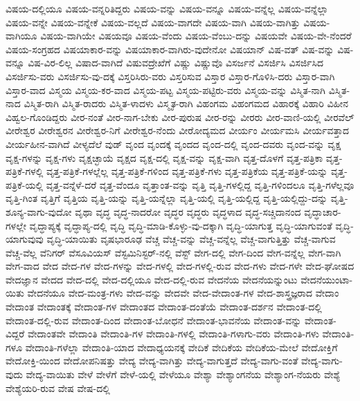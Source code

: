 {ವಿಷಯ-ದಲ್ಲಿಯೂ
ವಿಷಯ-ವನ್ನರಿತಿದ್ದರು
ವಿಷಯ-ವನ್ನು
ವಿಷಯ-ವನ್ನೂ
ವಿಷಯ-ವನ್ನೆಲ್ಲ
ವಿಷಯ-ವನ್ನೆಲ್ಲಾ
ವಿಷಯ-ವನ್ನೇ
ವಿಷಯ-ವನ್ನೇಕೆ
ವಿಷಯ-ವಲ್ಲದೆ
ವಿಷಯ-ವಾಗದೇ
ವಿಷಯ-ವಾಗಿ
ವಿಷಯ-ವಾಗಿತ್ತು
ವಿಷಯ-ವಾಗಿಯೂ
ವಿಷಯ-ವಾಗಿಯೇ
ವಿಷಯವೂ
ವಿಷಯ-ವೆಂದು
ವಿಷಯ-ವೆಂಬು-ದನ್ನು
ವಿಷಯವೇ
ವಿಷಯ-ವೇ-ನೆಂದರೆ
ವಿಷಯ-ಸಂಗ್ರಹದ
ವಿಷಯಾಕಾರ-ವನ್ನು
ವಿಷಯಾಕಾರ-ವಾಗಿರು-ವುದೇನೋ
ವಿಷಯಾನ್
ವಿಷ-ವತ್
ವಿಷ-ವನ್ನು
ವಿಷ-ವನ್ನೂ
ವಿಷ-ವಿರ-ಲಿಲ್ಲ
ವಿಷಾದ-ವಾಗಿದೆ
ವಿಷುವದ್ರೇಖೆಗೆ
ವಿಷ್ಣು
ವಿಷ್ಣುವೊ
ವಿಸರ್ಜನೆ
ವಿಸರ್ಜಿಸಿ
ವಿಸರ್ಜಿಸಿದ
ವಿಸರ್ಜಿಸು-ವರು
ವಿಸರ್ಜಿಸು-ವು-ದಕ್ಕೆ
ವಿಸ್ತರಿಸಿರು-ವರು
ವಿಸ್ತರಿಸುವ
ವಿಸ್ತಾರ
ವಿಸ್ತಾರ-ಗೊಳಿಸಿ-ದರು
ವಿಸ್ತಾರ-ವಾಗಿ
ವಿಸ್ತಾರ-ವಾದ
ವಿಸ್ಮಯ
ವಿಸ್ಮಯ-ಕರ-ವಾದ
ವಿಸ್ಮಯ-ಪಟ್ಟ
ವಿಸ್ಮಯ-ಪಟ್ಟಿರು-ವರು
ವಿಸ್ಮಯ-ವನ್ನು
ವಿಸ್ಮಿತ-ನಾಗಿ
ವಿಸ್ಮಿತ-ನಾದ
ವಿಸ್ಮಿತ-ರಾಗಿ
ವಿಸ್ಮಿತ-ರಾದರು
ವಿಸ್ಮಿತ-ಳಾದಳು
ವಿಸ್ಮೃತ-ರಾಗಿ
ವಿಹಂಗಮ
ವಿಹಂಗಮದ
ವಿಹಾರಕ್ಕೆ
ವಿಹಾರಿ
ವಿಹೀನ
ವಿಹ್ವಲ-ಗೊಂಡಿದ್ದರು
ವೀರ-ನಂತೆ
ವೀರ-ನಾಗ-ಬೇಕು
ವೀರ-ಪುರುಷ
ವೀರ-ರನ್ನು
ವೀರರು
ವೀರ-ವಾಣಿ-ಯಲ್ಲಿ
ವೀರವೆಲ್
ವೀರೇಶ್ವರ
ವೀರೇಶ್ವರನ
ವೀರೇಶ್ವರ-ನಿಗೆ
ವೀರೇಶ್ವರ-ನೆಂದು
ವೀರೋದ್ಯಮದ
ವೀರ್ಯಂ
ವೀರ್ಯಮಸಿ
ವೀರ್ಯವತ್ತಾದ
ವೀರ್ಯಹೀನ-ವಾಗಿದೆ
ವೀಳ್ಯದೆಲೆ
ವುಡ್
ವೃಂದ
ವೃಂದಕ್ಕೆ
ವೃಂದದ
ವೃಂದ-ದಲ್ಲಿ
ವೃಂದ-ದವರು
ವೃಂದ-ವನ್ನು
ವೃಕ್ಷ
ವೃಕ್ಷ-ಗಳನ್ನು
ವೃಕ್ಷ-ಗಳು
ವೃಕ್ಷಚ್ಛಾಯೆ
ವೃಕ್ಷದ
ವೃಕ್ಷ-ದಲ್ಲಿ
ವೃಕ್ಷ-ವನ್ನು
ವೃಕ್ಷ-ವಾಗಿ
ವೃತ್ತ-ದೊಳಗೆ
ವೃತ್ತ-ಪತ್ರಿಕಾ
ವೃತ್ತ-ಪತ್ರಿಕೆ-ಗಳಲ್ಲಿ
ವೃತ್ತ-ಪತ್ರಿಕೆ-ಗಳಲ್ಲೆಲ್ಲ
ವೃತ್ತ-ಪತ್ರಿಕೆ-ಗಳಿಂದ
ವೃತ್ತ-ಪತ್ರಿಕೆ-ಗಳು
ವೃತ್ತ-ಪತ್ರಿಕೆಯ
ವೃತ್ತ-ಪತ್ರಿಕೆ-ಯನ್ನು
ವೃತ್ತ-ಪತ್ರಿಕೆ-ಯಲ್ಲಿ
ವೃತ್ತ-ವನ್ನೆಳೆ-ದರೆ
ವೃತ್ತ-ವೆಂದೂ
ವೃತ್ತಾಂತ-ವನ್ನು
ವೃತ್ತಿ
ವೃತ್ತಿ-ಗಳಲ್ಲಿದ್ದ
ವೃತ್ತಿ-ಗಳಿಂದಲೂ
ವೃತ್ತಿ-ಗಳೆಲ್ಲವೂ
ವೃತ್ತಿ-ಗಿಂತ
ವೃತ್ತಿಗೆ
ವೃತ್ತಿಯ
ವೃತ್ತಿ-ಯನ್ನು
ವೃತ್ತಿ-ಯನ್ನೆಲ್ಲಾ
ವೃತ್ತಿ-ಯಲ್ಲಿ
ವೃತ್ತಿ-ಯಲ್ಲಿದ್ದ
ವೃತ್ತಿ-ಯಲ್ಲಿದ್ದು-ದನ್ನು
ವೃತ್ತಿ-ಶೂನ್ಯ-ವಾಗು-ವುದೋ
ವೃಥಾ
ವೃದ್ಧ
ವೃದ್ಧ-ನಾದರೋ
ವೃದ್ಧರ
ವೃದ್ಧರು
ವೃದ್ಧಳಾದ
ವೃದ್ಧ-ಸಚ್ಚಿದಾನಂದ
ವೃದ್ಧಾಚಾರ-ಗಳಲ್ಲೇ
ವೃದ್ಧಾಪ್ಯಕ್ಕೆ
ವೃದ್ಧಾಪ್ಯ-ದಲ್ಲಿ
ವೃದ್ಧಿ
ವೃದ್ಧಿ-ಮಾಡಿ-ಕೊಳ್ಳು-ವು-ದಕ್ಕಾಗಿ
ವೃದ್ಧಿ-ಯಾಗುತ್ತ
ವೃದ್ಧಿ-ಯಾಗುವಂತೆ
ವೃದ್ಧಿ-ಯಾಗುವುವು
ವೃದ್ಧಿ-ಯಾಯಿತು
ವೃಷಭಾರೂಢ
ವೆಚ್ಚ
ವೆಚ್ಚ-ವನ್ನು
ವೆಚ್ಚ-ವನ್ನೆಲ್ಲ
ವೆಚ್ಚ-ವಾಗುತ್ತಿತ್ತು
ವೆಚ್ಚ-ವಾಗುವ
ವೆಚ್ಚ-ವೆಲ್ಲ
ವೆನಿಗರ್
ವೆಸೂವಿಯಸ್
ವೆಸ್ಟಮಿನಿಸ್ಟರ್-ನಲ್ಲಿ
ವೆಸ್ಟ್
ವೇಗ-ದಲ್ಲಿ
ವೇಗ-ದಿಂದ
ವೇಗ-ವನ್ನೆಲ್ಲ
ವೇಗ-ವಾಗಿ
ವೇಗ-ವಾದ
ವೇದ
ವೇದ-ಗಳ
ವೇದ-ಗಳನ್ನು
ವೇದ-ಗಳಲ್ಲಿ
ವೇದ-ಗಳಲ್ಲಿ-ರುವ
ವೇದ-ಗಳು
ವೇದ-ಗಳೇ
ವೇದ-ಘೋಷದ
ವೇದಜ್ಞಾನ
ವೇದದ
ವೇದ-ದಲ್ಲಿ
ವೇದ-ದಲ್ಲಿಯೂ
ವೇದ-ದಲ್ಲಿ-ರುವ
ವೇದನೆಯ
ವೇದನೆಯನ್ನುಂಟು
ವೇದನೆಯುಂಟಾ-ಯಿತು
ವೇದನೆಯೂ
ವೇದ-ಮಂತ್ರ-ಗಳು
ವೇದ-ವನ್ನು
ವೇದವೇ
ವೇದ-ವೇದಾಂತ-ಗಳ
ವೇದ-ಶಾಸ್ತ್ರಜ್ಞರಾದ
ವೇದಾಂ
ವೇದಾಂತ
ವೇದಾಂತಕ್ಕೆ
ವೇದಾಂತ-ಗಳ
ವೇದಾಂತದ
ವೇದಾಂತ-ದಂತೆಯೆ
ವೇದಾಂತ-ದರ್ಶನ
ವೇದಾಂತ-ದಲ್ಲಿ
ವೇದಾಂತ-ದಲ್ಲಿ-ರುವ
ವೇದಾಂತ-ದಿಂದ
ವೇದಾಂತ-ಬೋಧನೆ
ವೇದಾಂತ-ಭಾವನೆಯ
ವೇದಾಂತ-ವನ್ನು
ವೇದಾಂತ-ವಿದ್ದರೆ
ವೇದಾಂತವೇ
ವೇದಾಂತಿ
ವೇದಾಂತಿ-ಗಳ
ವೇದಾಂತಿ-ಗಳಲ್ಲಿ
ವೇದಾಂತಿ-ಗಳಾಗು-ವರು
ವೇದಾಂತಿ-ಗಳು
ವೇದಾಂತಿ-ಗಳೂ
ವೇದಾಂತಿ-ಗಳೆಲ್ಲಾ
ವೇದಾಂತಿ-ಯಾದ
ವೇದಾಧ್ಯಯನಕ್ಕೆ
ವೇದಿಕೆ
ವೇದಿಕೆಯ
ವೇದಿಕೆಯ-ಮೇಲೆ
ವೇದೋಕ್ತಿಗೆ
ವೇದೋಕ್ತಿ-ಯಿಂದ
ವೇದೋಪನಿಷತ್ತು
ವೇದ್ಯ
ವೇದ್ಯ-ವಾಗಿತ್ತು
ವೇದ್ಯ-ವಾಗುತ್ತದೆ
ವೇದ್ಯ-ವಾಗು-ವಂತೆ
ವೇದ್ಯ-ವಾಗು-ವುದು
ವೇದ್ಯ-ವಾಯಿತು
ವೇಳೆ
ವೇಳೆಗೆ
ವೇಳೆ-ಯಲ್ಲಿ
ವೇಳೆಯೂ
ವೇಶ್ಯಾ
ವೇಶ್ಯಾಂಗನೆಯ
ವೇಶ್ಯಾಂಗ-ನೆಯರು
ವೇಶ್ಯೆ
ವೇಶ್ಯೆಯರಿ-ರುವ
ವೇಷ
ವೇಷ-ದಲ್ಲಿ
}
